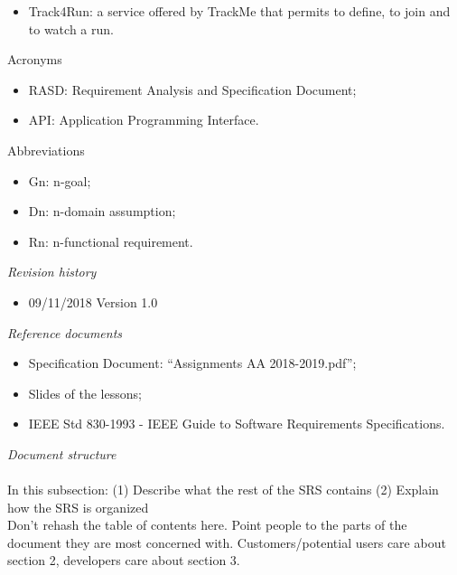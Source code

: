 \documentclass{article}
\begin{document}
\begin{legal}
\begin{legal}
\begin{legal}
{\begin{itemize}
				\item Track4Run: a service offered by TrackMe that permits to define, to join and to watch a run.\\
				\end{itemize}
			}	
			\item Acronyms\\
			{\normalfont	
				\begin{itemize}
				\item RASD: Requirement Analysis and Specification Document;\\
				\item API: Application Programming Interface.\\
				\end{itemize}
			}
			\item Abbreviations\\
			{\normalfont	
				\begin{itemize}
				\item Gn: n-goal;\\
				\item Dn: n-domain assumption;\\
				\item Rn: n-functional requirement.\\
				\end{itemize}
			}
			\end{legal}
		\item \textit{Revision history}\\
		{\normalfont
			\begin{itemize}
			\item 09/11/2018		Version 1.0\\
			\end{itemize}
		}
		\item \textit{Reference documents}\\
		{\normalfont	
			\begin{itemize}
			\item Specification Document: “Assignments AA 2018-2019.pdf”;\\
			\item Slides of the lessons;\\
			\item IEEE Std 830-1993 - IEEE Guide to Software Requirements Specifications.\\
			\end{itemize}
		}
		\item \textit{Document structure}\\\\
		{\normalfont
In this subsection:
(1)	Describe what the rest of the SRS contains
(2)	Explain how the SRS is organized
\\
Don’t rehash the table of contents here.  Point people to the parts of the document they are most concerned with.  Customers/potential users care about section 2, developers care about section 3.
		}
		\end{legal}


\end{legal}
\end{document}
